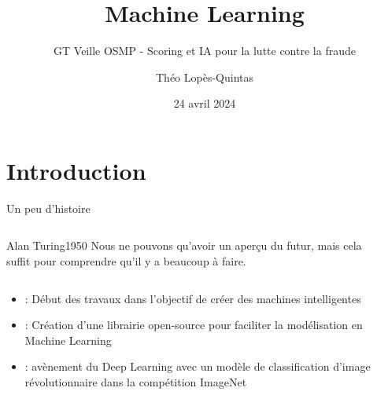 \documentclass{beamer}
\title[Machine Learning pour la lutte contre la fraude - GT Veille OSMP]{Machine Learning}
\subtitle{GT Veille OSMP - Scoring et IA pour la lutte contre la fraude}
\author[]{Théo Lopès-Quintas}
\institute{BPCE Payment Services}
\date{24 avril 2024}
\begin{document}
{
\begin{frame}
	\titlepage
\end{frame}
}
\addtocounter{framenumber}{-1}



{
\begin{frame}
	\tableofcontents
\end{frame}
}
\addtocounter{framenumber}{-1}

\AtBeginSection[]
{
    \begin{frame}
        \frametitle{}
        \tableofcontents[currentsection]
    \end{frame}
}


\section{Introduction}

\begin{frame}{}{Un peu d'histoire}

	\begin{columns}
		\begin{column}{0.7\textwidth}
			\begin{customquote}{Alan Turing}{1950}
				Nous ne pouvons qu’avoir un aperçu du futur, mais cela suffit pour comprendre qu’il y a
beaucoup à faire.
			\end{customquote}
		\end{column}
		\begin{column}{0.3\textwidth}
		\end{column}
	\end{columns}
	
	\begin{itemize}
		\item {} : Début des travaux dans l'objectif de créer des machines intelligentes
		\item {} : Création d'une librairie open-source pour faciliter la modélisation en Machine Learning
		\item {} : avènement du Deep Learning avec un modèle de classification d'image révolutionnaire dans la compétition ImageNet
	\end{itemize}
\end{frame}
\end{document}
